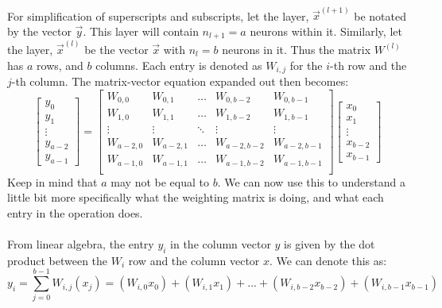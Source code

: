\documentclass[12pt,letterpaper]{article}
\begin{document}
\paragraph*{}For simplification of superscripts and subscripts, let the layer, $\vec{x}^{(l+1)}$ be notated by the vector $\vec{y}$. This layer will contain $n_{l+1} = a$ neurons within it. Similarly, let the layer, $\vec{x}^{(l)}$ be the vector $\vec{x}$ with $n_l = b$ neurons in it. Thus the matrix $W^{(l)}$ has $a$ rows, and $b$ columns. Each entry is denoted as $W_{i,j}$ for the $i$-th row and the $j$-th column. The matrix-vector equation expanded out then becomes:
\begin{equation}
\label{mat-vec feed}
\begin{bmatrix}
y_0 \\ y_1 \\ \vdots \\ y_{a-2} \\ y_{a-1}
\end{bmatrix} =
\begin{bmatrix}
W_{0,0} & W_{0,1} & \hdots & W_{0,b-2} & W_{0,b-1} \\
W_{1,0} & W_{1,1} & \hdots & W_{1,b-2} & W_{1,b-1} \\
\vdots & \vdots & \ddots & \vdots & \vdots \\
W_{a-2,0} & W_{a-2,1} & \hdots & W_{a-2,b-2} & W_{a-2,b-1} \\
W_{a-1,0} & W_{a-1,1} & \hdots & W_{a-1,b-2} & W_{a-1,b-1} \\
\end{bmatrix}
\begin{bmatrix}
x_0 \\ x_1 \\ \vdots \\ x_{b-2} \\ x_{b-1}
\end{bmatrix}
\end{equation}
Keep in mind that $a$ may not be equal to $b$. We can now use this to understand a little bit more specifically what the weighting matrix is doing, and what each entry in the operation does.
\paragraph*{}From linear algebra, the entry $y_i$ in the column vector $y$ is given by the dot product between the $W_i$ row and the column vector $x$. We can denote this as:
\begin{equation}
\label{dot prod}
y_i = \sum_{j=0}^{b-1} W_{i,j}(x_j) = 
(W_{i,0}x_0) + (W_{i,1}x_1) +  ... + 
(W_{i,b-2}x_{b-2}) + (W_{i,b-1}x_{b-1})
\end{equation}
\end{document}
